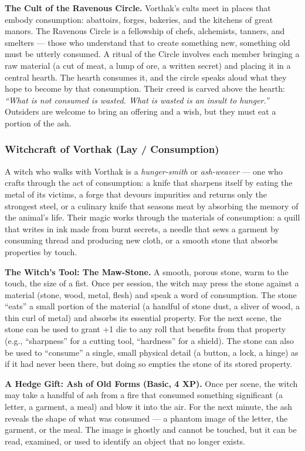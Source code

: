\textbf{The Cult of the Ravenous Circle.} Vorthak's cults meet in places that embody consumption: abattoirs, forges, bakeries, and the kitchens of great manors. The Ravenous Circle is a fellowship of chefs, alchemists, tanners, and smelters --- those who understand that to create something new, something old must be utterly consumed. A ritual of the Circle involves each member bringing a raw material (a cut of meat, a lump of ore, a written secret) and placing it in a central hearth. The hearth consumes it, and the circle speaks aloud what they hope to become by that consumption. Their creed is carved above the hearth: \textit{``What is not consumed is wasted. What is wasted is an insult to hunger.''} Outsiders are welcome to bring an offering and a wish, but they must eat a portion of the ash.

\subsubsection*{Witchcraft of Vorthak (Lay / Consumption)}

A witch who walks with Vorthak is a \textit{hunger-smith} or \textit{ash-weaver} --- one who crafts through the act of consumption: a knife that sharpens itself by eating the metal of its victims, a forge that devours impurities and returns only the strongest steel, or a culinary knife that seasons meat by absorbing the memory of the animal's life. Their magic works through the materials of consumption: a quill that writes in ink made from burnt secrets, a needle that sews a garment by consuming thread and producing new cloth, or a smooth stone that absorbs properties by touch.

\textbf{The Witch's Tool: The Maw-Stone.} A smooth, porous stone, warm to the touch, the size of a fist. Once per session, the witch may press the stone against a material (stone, wood, metal, flesh) and speak a word of consumption. The stone ``eats'' a small portion of the material (a handful of stone dust, a sliver of wood, a thin curl of metal) and absorbs its essential property. For the next scene, the stone can be used to grant +1 die to any roll that benefits from that property (e.g., ``sharpness'' for a cutting tool, ``hardness'' for a shield). The stone can also be used to ``consume'' a single, small physical detail (a button, a lock, a hinge) as if it had never been there, but doing so empties the stone of its stored property.

\textbf{A Hedge Gift: Ash of Old Forms (Basic, 4 XP).} Once per scene, the witch may take a handful of ash from a fire that consumed something significant (a letter, a garment, a meal) and blow it into the air. For the next minute, the ash reveals the shape of what was consumed --- a phantom image of the letter, the garment, or the meal. The image is ghostly and cannot be touched, but it can be read, examined, or used to identify an object that no longer exists.

